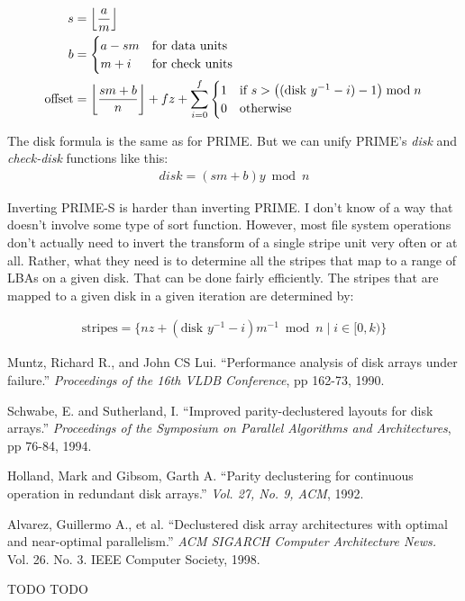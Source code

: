 \documentclass[onecolumn,draft]{IEEEtran}
\DeclarePairedDelimiter\floor{\lfloor}{\rfloor}
\begin{document}
\begin{align}
	s &= \floor*{\frac{a}{m}} \\
	b &= \begin{cases}
		a - s m & \text{for data units} \\
		m + i & \text{for check units}
	\end{cases} \\
	\text{offset} &= \floor*{\frac{s m + b}{n}} + f z +
	\displaystyle\sum_{i=0}^{f} \begin{cases}
		1 & \text{if } s > \big((\text{disk } y^{-1} - i) - 1\big) \bmod n \\
		0 & \text{otherwise}
	\end{cases}
\end{align}

The disk formula is the same as for PRIME.  But we can unify PRIME's \emph{disk} and \emph{check-disk} functions like this:
\begin{align}
	disk = (s m + b) y \bmod n
\end{align}

Inverting PRIME-S is harder than inverting PRIME.  I don't know of a way that
doesn't involve some type of sort function.  However, most file system
operations don't actually need to invert the transform of a single stripe unit
very often or at all.  Rather, what they need is to determine all the stripes
that map to a range of LBAs on a given disk.  That can be done fairly
efficiently.  The stripes that are mapped to a given disk in a given iteration
are determined by:

\begin{align}
	\text{stripes} = \{ n z + (\text{disk } y^{-1} - i) m^{-1} \bmod n
	\mid i \in [0, k) \}
\end{align}

\begin{thebibliography}{99}

 Muntz, Richard R., and John CS Lui. ``Performance analysis
of disk arrays under failure.'' \emph{Proceedings of the 16th VLDB Conference},
pp 162-73, 1990.

 Schwabe, E. and Sutherland, I.  ``Improved
parity-declustered layouts for disk arrays.'' \emph{Proceedings of the
Symposium on Parallel Algorithms and Architectures}, pp 76-84, 1994.

 Holland, Mark and Gibsom, Garth A. ``Parity declustering for
continuous operation in redundant disk arrays.'' \emph{Vol. 27, No. 9, ACM},
1992.

 Alvarez, Guillermo A., et al. ``Declustered disk array
architectures with optimal and near-optimal parallelism.'' \emph{ACM SIGARCH
Computer Architecture News.} Vol. 26. No. 3. IEEE Computer Society, 1998.

 TODO
 TODO

\end{thebibliography}
\end{document}
